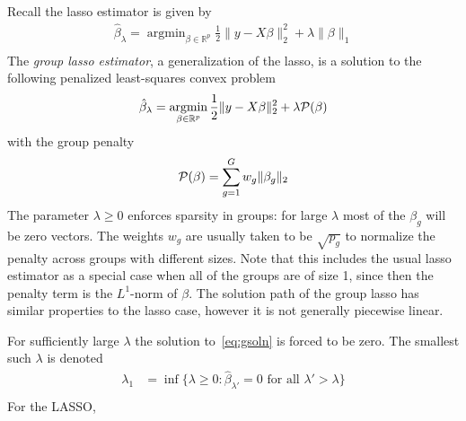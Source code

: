 \documentclass{imsart}
\newcommand{\argmin}{\mathop{\mathrm{argmin}}}
\newcommand{\real}{\mathbb{R}}
\begin{document}
Recall the lasso estimator is given by
\begin{equation}
\begin{aligned}
\label{eq:lasso}
\displaystyle \hat \beta_\lambda = \argmin_{\beta \in \real^p} \frac{1}{2} \| y - X \beta \|_2^2 +
   \lambda \| \beta \|_1 \\
\end{aligned}
\end{equation}
The \emph{group lasso estimator}, a generalization of the lasso,
 is a solution to the following penalized
least-squares convex problem
\begin{equation}
\begin{aligned}
\label{eq:gsoln}
\displaystyle \hat \beta_\lambda = \argmin_{\beta \in \real^p} \frac{1}{2} \| y - X \beta \|_2^2 +
   \lambda {\cal P}(\beta) \\
\end{aligned}
\end{equation}
with the group penalty
\begin{equation}
  \begin{aligned}
  \label{eq:gpen}
    {\cal P}(\beta)&= \sum_{g=1}^G w_g \| \beta_g \|_2 \\
  \end{aligned}
\end{equation}
The parameter $\lambda \geq 0$ enforces sparsity in groups: for large
$\lambda$ most of the $\beta_g$ will be zero vectors. The weights
$w_g$ are usually taken to be $\sqrt {p_g}$ to normalize the penalty
across groups with different sizes.  Note that this includes the usual lasso estimator as a
special case when all of the groups are of size 1, since then the
penalty term is the $L^1$-norm of $\beta$. The solution path of the group
lasso has similar properties to the lasso case, however it is not
generally piecewise linear.

For sufficiently large $\lambda$ the solution to~\eqref{eq:gsoln} is forced
to be zero. The smallest such $\lambda$ is denoted
\begin{equation}
  \begin{aligned}
   \lambda_1 &= \inf \{ \lambda \geq 0 : \hat \beta_{\lambda'} = 0 \text{ for all } \lambda' > \lambda \} \\
  \end{aligned}
\end{equation}
For the LASSO,
\end{document}
